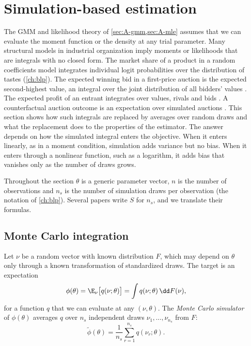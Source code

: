 \section{Simulation-based estimation}\label{sec:A-simulation}

The GMM and likelihood theory of \cref{sec:A-gmm,sec:A-mle} assumes that we can evaluate the moment function or the
density at any trial parameter. Many structural models in industrial organization imply moments or likelihoods that
are integrals with no closed form. The market share of a product in a random coefficients model integrates individual logit probabilities over
the distribution of tastes (\cref{ch:blp}). The expected winning bid in a first-price auction is the expected
second-highest value, an integral over the joint distribution of all bidders' values
\citep{LaffontOssardVuong1995}. The expected profit of an entrant integrates over values, rivals and bids
\citep{AtheyLevinSeira2011}. A counterfactual auction outcome is an expectation over simulated auctions
\citep{Asker2010}. This section shows how such integrals are replaced by averages over random draws and what the
replacement does to the properties of the estimator. The answer depends on how the simulated integral enters the
objective. When it enters linearly, as in a moment condition, simulation adds variance but no bias. When it enters
through a nonlinear function, such as a logarithm, it adds bias that vanishes only as the number of draws grows.

Throughout the section $\theta$ is a generic parameter vector, $n$ is the number of observations and $n_s$ is the
number of simulation draws per observation (the notation of \cref{ch:blp}). Several papers write $S$ for $n_s$, and
we translate their formulas.

\subsection{Monte Carlo integration}\label{sec:A-mc-integration}

Let $\nu$ be a random vector with known distribution $F$, which may depend on $\theta$ only through a known
transformation of standardized draws. The target is an expectation
\begin{equation}\label{eq:A-mc-target}
  \phi(\theta) = \E_\nu\bigl[q(\nu;\theta)\bigr] = \int q(\nu;\theta)\,\dd F(\nu),
\end{equation}
for a function $q$ that we can evaluate at any $(\nu, \theta)$. The \emph{Monte Carlo simulator} of $\phi(\theta)$
averages $q$ over $n_s$ independent draws $\nu_1, \dots, \nu_{n_s}$ from $F$:
\begin{equation}\label{eq:A-mc-simulator}
  \tilde\phi(\theta) = \frac{1}{n_s}\sum_{r=1}^{n_s} q(\nu_r;\theta).
\end{equation}

